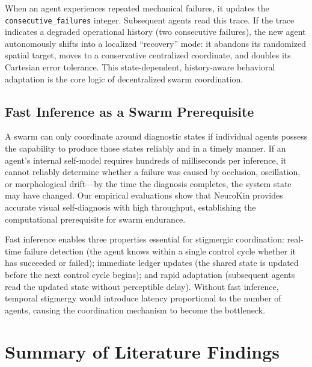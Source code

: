 \documentclass[12pt,a4paper,oneside]{report}
\begin{document}
When an agent experiences repeated mechanical failures, it updates the \texttt{consecutive\_failures} integer. Subsequent agents read this trace. If the trace indicates a degraded operational history (two consecutive failures), the new agent autonomously shifts into a localized ``recovery'' mode: it abandons its randomized spatial target, moves to a conservative centralized coordinate, and doubles its Cartesian error tolerance. This state-dependent, history-aware behavioral adaptation is the core logic of decentralized swarm coordination.
\subsection{Fast Inference as a Swarm Prerequisite}
\label{subsec:fast_inference_as_a_swarm_prerequisite}

A swarm can only coordinate around diagnostic states if individual agents possess the capability to produce those states reliably and in a timely manner. If an agent's internal self-model requires hundreds of milliseconds per inference, it cannot reliably determine whether a failure was caused by occlusion, oscillation, or morphological drift---by the time the diagnosis completes, the system state may have changed. Our empirical evaluations show that NeuroKin provides accurate visual self-diagnosis with high throughput, establishing the computational prerequisite for swarm endurance.

Fast inference enables three properties essential for stigmergic coordination: real-time failure detection (the agent knows within a single control cycle whether it has succeeded or failed); immediate ledger updates (the shared state is updated before the next control cycle begins); and rapid adaptation (subsequent agents read the updated state without perceptible delay). Without fast inference, temporal stigmergy would introduce latency proportional to the number of agents, causing the coordination mechanism to become the bottleneck.
\section{Summary of Literature Findings}
\end{document}
